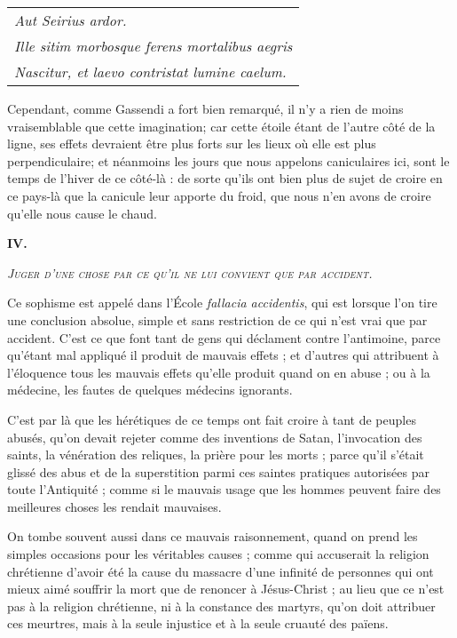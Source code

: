 	\begin{tabularx}{\textwidth}{X}
		\emph{Aut Seirius ardor.} \\
		\emph{Ille sitim morbosque ferens mortalibus aegris} \\
		\emph{Nascitur, et laevo contristat lumine caelum.} \\
	\end{tabularx}

Cependant, comme Gassendi a fort bien remarqué, il n'y a rien de moins vraisemblable que cette imagination; car cette étoile étant de l'autre côté de la ligne, ses effets devraient être plus forts sur les lieux où elle est plus perpendiculaire; et néanmoins les jours que nous appelons caniculaires ici, sont le temps de l'hiver de ce côté-là : de sorte qu'ils ont bien plus de sujet de croire en ce pays-là que la canicule leur apporte du froid, que nous n'en avons de croire qu'elle nous cause le chaud.

\begin{center}{\bfseries\large IV.}\end{center}
\begin{center}\emph{\scshape Juger d'une chose par ce qu'il ne lui convient que par accident.}\end{center}

Ce sophisme est appelé dans l'École \emph{fallacia accidentis}, qui est lorsque l'on tire une conclusion absolue, simple et sans restriction de ce qui n'est vrai que par accident. C'est ce que font tant de gens qui déclament contre l'antimoine, parce qu'étant mal appliqué il produit de mauvais effets ; et d'autres qui attribuent à l'éloquence tous les mauvais effets qu'elle produit quand on en abuse ; ou à la médecine, les fautes de quelques médecins ignorants.

C'est par là que les hérétiques de ce temps ont fait croire à tant de peuples abusés, qu'on devait rejeter comme des inventions de Satan, l'invocation des saints, la vénération des reliques, la prière pour les morts ; parce qu'il s'était glissé des abus et de la superstition parmi ces saintes pratiques autorisées par toute l'Antiquité ; comme si le mauvais usage que les hommes peuvent faire des meilleures choses les rendait mauvaises.

On tombe souvent aussi dans ce mauvais raisonnement, quand on prend les simples occasions pour les véritables causes ; comme qui accuserait la religion chrétienne d'avoir été la cause du massacre d'une infinité de personnes qui ont mieux aimé souffrir la mort que de renoncer à Jésus-Christ ; au lieu que ce n'est pas à la religion chrétienne, ni à la constance des martyrs, qu'on doit attribuer ces meurtres, mais à la seule injustice et à la seule cruauté des païens.

